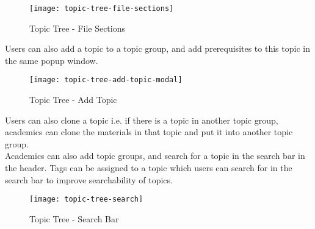 \begin{figure}[h!]
    \centering
    \texttt{[image: topic-tree-file-sections]}
    \caption{Topic Tree - File Sections}
\end{figure}

Users can also add a topic to a topic group, and add prerequisites to this topic in the same popup window. 

\begin{figure}[h!]
    \centering
    \texttt{[image: topic-tree-add-topic-modal]}
    \caption{Topic Tree - Add Topic}
\end{figure}

Users can also clone a topic i.e. if there is a topic in another topic group, academics can clone the materials in that topic and put it into another topic group. \\

Academics can also add topic groups, and search for a topic in the search bar in the header. Tags can be assigned to a topic which users can search for in the search bar to improve searchability of topics.

\begin{figure}[h!]
    \centering
    \texttt{[image: topic-tree-search]}
    \caption{Topic Tree - Search Bar}
\end{figure}
